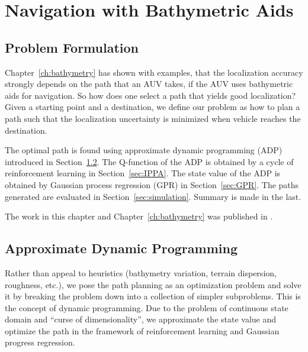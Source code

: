 \chapter{Navigation with Bathymetric Aids}
\label{ch:ban}

\section{Problem Formulation}

Chapter~\ref{ch:bathymetry} has shown with examples, that the localization accuracy strongly depends on the path that an AUV takes, if the AUV uses bathymetric aids for navigation. So how does one select a path that yields good localization? Given a starting point and a destination, we define our problem as how to plan a path such that the localization uncertainty is minimized when vehicle reaches the destination.

The optimal path is found using approximate dynamic programming (ADP) introduced in Section~\ref{sec:adp}. The Q-function of the ADP is obtained by a cycle of reinforcement learning in Section~\ref{sec:IPPA}. The state value of the ADP is obtained by Gaussian process regression (GPR) in Section~\ref{sec:GPR}. The paths generated are evaluated in Section~\ref{sec:simulation}. Summary is made in the last.

The work in this chapter and Chapter~\ref{ch:bathymetry} was published in \cite{Gao2018}.


\section{Approximate Dynamic Programming}
\label{sec:adp}
Rather than appeal to heuristics (bathymetry variation, terrain dispersion, roughness, etc.), we pose the path planning as an optimization problem and solve it by breaking the problem down into a collection of simpler subproblems. This is the concept of dynamic programming. Due to the problem of continuous state domain and ``curse of dimensionality'', we approximate the state value and optimize the path in the framework of reinforcement learning and Gaussian progress regression.

